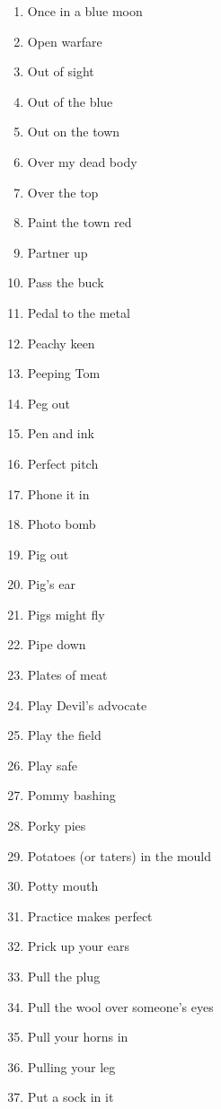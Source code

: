 \begin{enumerate}
        \item  Once in a blue moon
        \item  Open warfare
        \item  Out of sight
        \item  Out of the blue
        \item  Out on the town
        \item  Over my dead body
        \item  Over the top
        \item  Paint the town red
        \item  Partner up
        \item  Pass the buck
        \item  Pedal to the metal
        \item  Peachy keen
        \item  Peeping Tom
        \item  Peg out
        \item  Pen and ink
        \item  Perfect pitch
        \item  Phone it in
        \item  Photo bomb
        \item  Pig out
        \item  Pig's ear
        \item  Pigs might fly
        \item  Pipe down
        \item  Plates of meat
        \item  Play Devil's advocate
        \item  Play the field
        \item  Play safe
        \item  Pommy bashing
        \item  Porky pies
        \item  Potatoes (or taters) in the mould
        \item  Potty mouth
        \item  Practice makes perfect
        \item  Prick up your ears
        \item  Pull the plug
        \item  Pull the wool over someone's eyes
        \item  Pull your horns in
        \item  Pulling your leg
        \item  Put a sock in it

\end{enumerate}
